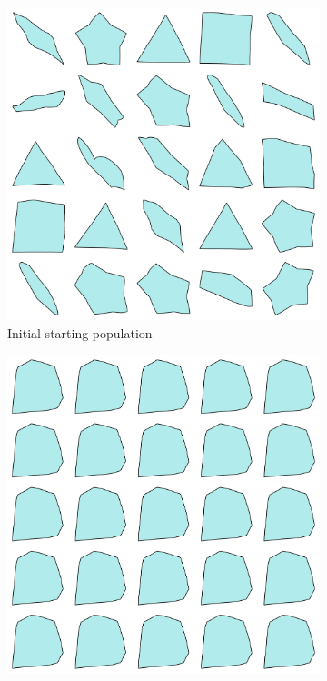 \documentclass{article}
\begin{document}
\begin{figure}[H]
    \centering
    \begin{subfigure}[b]{0.32\textwidth}
        \centering
        \includegraphics[width=\textwidth]{figures/GAResults/GA19/50init_pop.png}
        \caption{Initial starting population}
        \label{fig:GA19_starting}
    \end{subfigure}
    \hfill
    \begin{subfigure}[b]{0.32\textwidth}
        \centering
        \includegraphics[width=\textwidth]{figures/GAResults/GA19/latent/final_generation.png}

\end{subfigure}
\end{figure}
\end{document}
